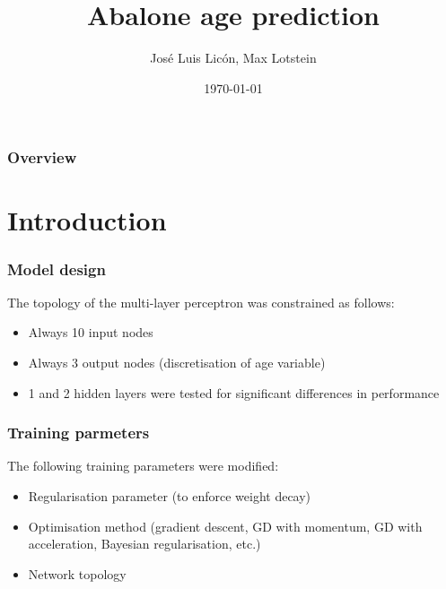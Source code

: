 \documentclass[10pt]{beamer}
\title[Abalone]
{Abalone age prediction}
\author{José Luis Licón, Max Lotstein} %
\institute[Uni Freiburg] %
{
Albert-Ludwigs-Universität Freiburg \\ %
\medskip
\textit{emails} %
}
\date{\today} %
\begin{document}



\begin{frame}
\titlepage %
\end{frame}

\begin{frame}
\frametitle{Overview} %
\tableofcontents %
\end{frame}


\section{Introduction}
\begin{frame}\frametitle{Model design}
  The topology of the multi-layer perceptron was constrained as follows:
  \begin{itemize}
    \item Always 10 input nodes
    \item Always 3 output nodes (discretisation of age variable)
    \item 1 and 2 hidden layers were tested for significant differences in 
    performance
  \end{itemize}
\end{frame}


\begin{frame}\frametitle{Training parmeters}

The following training parameters were modified:
\begin{itemize}
  \item Regularisation parameter (to enforce weight decay)
  \item Optimisation method (gradient descent, GD with momentum, GD with
  acceleration, Bayesian regularisation, etc.)
  \item Network topology
\end{itemize}

\end{frame}
\end{document}
